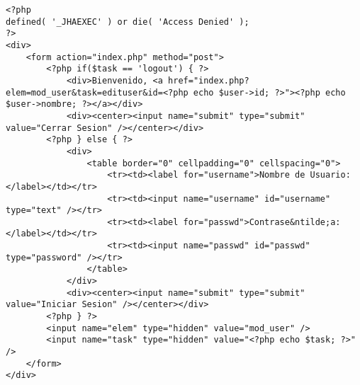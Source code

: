\begin{lstlisting}[label=jha_block_login_tpl,caption=Plantilla del bloque.]
<?php 
defined( '_JHAEXEC' ) or die( 'Access Denied' );
?>
<div>
    <form action="index.php" method="post">
        <?php if($task == 'logout') { ?>
            <div>Bienvenido, <a href="index.php?elem=mod_user&task=edituser&id=<?php echo $user->id; ?>"><?php echo $user->nombre; ?></a></div>
            <div><center><input name="submit" type="submit" value="Cerrar Sesion" /></center></div>
        <?php } else { ?>
            <div>
                <table border="0" cellpadding="0" cellspacing="0">
                    <tr><td><label for="username">Nombre de Usuario: </label></td></tr>
                    <tr><td><input name="username" id="username" type="text" /></tr>
                    <tr><td><label for="passwd">Contrase&ntilde;a: </label></td></tr>
                    <tr><td><input name="passwd" id="passwd" type="password" /></tr>
                </table>
            </div>
            <div><center><input name="submit" type="submit" value="Iniciar Sesion" /></center></div>
        <?php } ?>
        <input name="elem" type="hidden" value="mod_user" />
        <input name="task" type="hidden" value="<?php echo $task; ?>" />
    </form>
</div>
\end{lstlisting}
